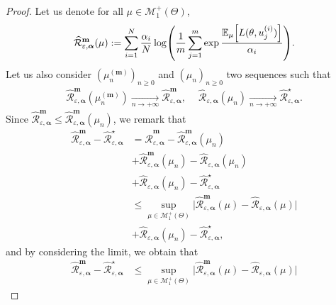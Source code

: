 \begin{proof}
Let us denote for all $\mu\in\mathcal{M}_1^{+}(\Theta)$,
\begin{align*}
  \widehat{\mathcal{R}}^{\textbf{m}}_{\varepsilon,\bm{\alpha}}(\mu):=  \sum_{i=1}^\numsamples  \frac{\alpha_i}{\numsamples}\log\left( \frac{1}{m}\sum_{j=1}^{m}\exp\frac{\mathbb{E}_{ \mu}\left[\loss(\theta,u_j^{(i)})\right]}{\alpha_i}\right).
\end{align*}
Let us also consider $(\mu^{(\textbf{m})}_n)_{n\geq 0}$ and $(\mu_n)_{n\geq 0}$ two sequences such that
\begin{align*}
 \widehat{\mathcal{R}}^{\textbf{m}}_{\varepsilon,\bm{\alpha}}(\mu^{(\textbf{m})}_n) \xrightarrow[n \to +\infty]{}\widehat{\mathcal{R}}^{\textbf{m}}_{\varepsilon,\bm{\alpha}},~\quad
\widehat{\mathcal{R}}_{\varepsilon,\bm{\alpha}}(\mu_n)\xrightarrow[n \to +\infty]{}\widehat{\mathcal{R}}^{\star}_{\varepsilon,\bm{\alpha}}.
\end{align*}
Since $\widehat{\mathcal{R}}^{\textbf{m}}_{\varepsilon,\bm{\alpha}} \leq \widehat{\mathcal{R}}^{\textbf{m}}_{\varepsilon,\bm{\alpha}}(\mu_n)$, we remark that
\begin{align*}
\widehat{\mathcal{R}}^{\textbf{m}}_{\varepsilon,\bm{\alpha}}- \widehat{\mathcal{R}}^{\star}_{\varepsilon,\bm{\alpha}}& =\widehat{\mathcal{R}}^{\textbf{m}}_{\varepsilon,\bm{\alpha}} - \widehat{\mathcal{R}}^{\textbf{m}}_{\varepsilon,\bm{\alpha}}(\mu_n)\\
& + \widehat{\mathcal{R}}^{\textbf{m}}_{\varepsilon,\bm{\alpha}}(\mu_n) - \widehat{\mathcal{R}}_{\varepsilon,\bm{\alpha}}(\mu_n)\\
&+ \widehat{\mathcal{R}}_{\varepsilon,\bm{\alpha}}(\mu_n)-
\widehat{\mathcal{R}}^{\star}_{\varepsilon,\bm{\alpha}} \\
&\leq \sup_{\mu\in \mathcal{M}^+_1(\Theta)}\Big|\widehat{\mathcal{R}}^{\textbf{m}}_{\varepsilon,\bm{\alpha}}(\mu) - \widehat{\mathcal{R}}_{\varepsilon,\bm{\alpha}}(\mu) \Big|\\
& + \widehat{\mathcal{R}}_{\varepsilon,\bm{\alpha}}(\mu_n)-
\widehat{\mathcal{R}}^{\star}_{\varepsilon,\bm{\alpha}},
\end{align*}
and by considering the limit, we obtain that
\begin{align*}
  \widehat{\mathcal{R}}^{\textbf{m}}_{\varepsilon,\bm{\alpha}}- \widehat{\mathcal{R}}^{\star}_{\varepsilon,\bm{\alpha}}&\leq  \sup_{\mu\in \mathcal{M}^+_1(\Theta)}\Big|\widehat{\mathcal{R}}^{\textbf{m}}_{\varepsilon,\bm{\alpha}}(\mu) - \widehat{\mathcal{R}}_{\varepsilon,\bm{\alpha}}(\mu) \Big| 

\end{align*}
\end{proof}
